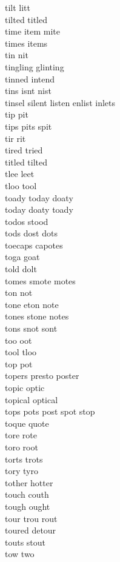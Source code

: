 tilt litt\\
tilted titled\\
time item mite\\
times items\\
tin nit\\
tingling glinting\\
tinned intend\\
tins isnt nist\\
tinsel silent listen enlist inlets\\
tip pit\\
tips pits spit\\
tir rit\\
tired tried\\
titled tilted\\
tlee leet\\
tloo tool\\
toady today doaty\\
today doaty toady\\
todos stood\\
tods dost dots\\
toecaps capotes\\
toga goat\\
told dolt\\
tomes smote motes\\
ton not\\
tone eton note\\
tones stone notes\\
tons snot sont\\
too oot\\
tool tloo\\
top pot\\
topers presto poster\\
topic optic\\
topical optical\\
tops pots post spot stop\\
toque quote\\
tore rote\\
toro root\\
torts trots\\
tory tyro\\
tother hotter\\
touch couth\\
tough ought\\
tour trou rout\\
toured detour\\
touts stout\\
tow two\\
